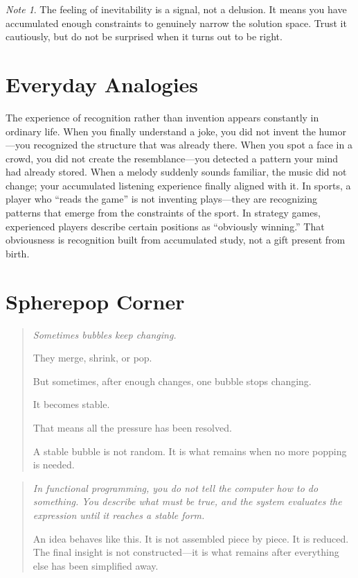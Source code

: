 \documentclass[11pt]{book}
\theoremstyle{definition}
\theoremstyle{remark}
\newtheorem{remark}[definition]{Note}
\newenvironment{literaryaside}
  {\begin{quote}\small\itshape}
  {\end{quote}}
\newenvironment{spherepopjunior}
  {\begin{quote}\small\itshape}
  {\end{quote}}
\begin{document}
\begin{remark}
The feeling of inevitability is a signal, not a delusion. It means you have
accumulated enough constraints to genuinely narrow the solution space. Trust
it cautiously, but do not be surprised when it turns out to be right.
\end{remark}

\section*{Everyday Analogies}

The experience of recognition rather than invention appears constantly
in ordinary life. When you finally understand a joke, you did not invent
the humor---you recognized the structure that was already there. When
you spot a face in a crowd, you did not create the resemblance---you
detected a pattern your mind had already stored. When a melody suddenly
sounds familiar, the music did not change; your accumulated listening
experience finally aligned with it. In sports, a player who ``reads the
game'' is not inventing plays---they are recognizing patterns that emerge
from the constraints of the sport. In strategy games, experienced players
describe certain positions as ``obviously winning.'' That obviousness is
recognition built from accumulated study, not a gift present from birth.

\section*{Spherepop Corner}

\begin{spherepopjunior}
Sometimes bubbles keep changing.

They merge, shrink, or pop.

But sometimes, after enough changes, one bubble stops changing.

It becomes stable.

That means all the pressure has been resolved.

A stable bubble is not random. It is what remains when no more popping
is needed.
\end{spherepopjunior}

\begin{literaryaside}
In functional programming, you do not tell the computer how to do
something. You describe what must be true, and the system evaluates the
expression until it reaches a stable form.

An idea behaves like this. It is not assembled piece by piece. It is
reduced. The final insight is not constructed---it is what remains after
everything else has been simplified away.
\end{literaryaside}
\end{document}
